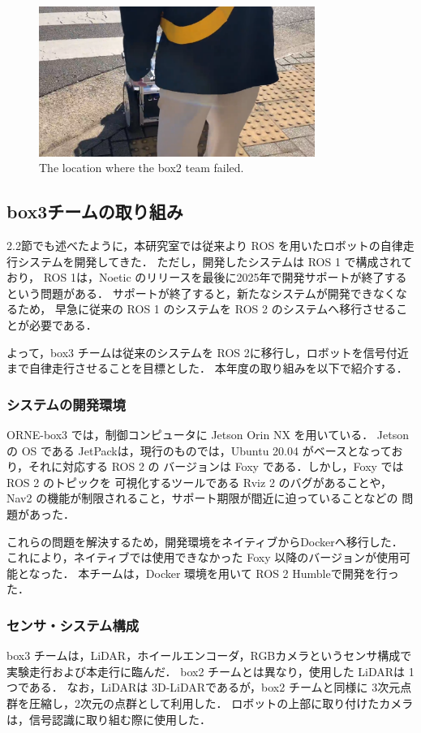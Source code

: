 \documentclass[twocolumn, 9pt]{jsproceedings}
\begin{document}
\begin{figure}[h!]
  \centering
  \includegraphics[width=90mm]{fig/result_box2_cut.pdf}
  \caption{The location where the box2 team failed.}
  \label{fig:box2-result}
\end{figure}

\subsection{box3チームの取り組み}
2.2節でも述べたように，本研究室では従来より ROS を用いたロボットの自律走行システムを開発してきた．
ただし，開発したシステムは ROS 1 で構成されており，
ROS 1は，Noetic\cite{noetic} のリリースを最後に2025年で開発サポートが終了するという問題がある．
サポートが終了すると，新たなシステムが開発できなくなるため，
早急に従来の ROS 1 のシステムを ROS 2 のシステムへ移行させることが必要である．

よって，box3 チームは従来のシステムを ROS 2に移行し，ロボットを信号付近まで自律走行させることを目標とした．
本年度の取り組みを以下で紹介する．

\subsubsection{システムの開発環境}
ORNE-box3 では，制御コンピュータに Jetson Orin NX を用いている．
Jetson の OS である JetPackは，現行のものでは，Ubuntu 20.04 がベースとなっており，それに対応する ROS 2 の
バージョンは Foxy\cite{foxy} である．しかし，Foxy では ROS 2 のトピックを 可視化するツールである Rviz 2 
のバグがあることや，Nav2\cite{nav2} の機能が制限されること，サポート期限が間近に迫っていることなどの
問題があった．

これらの問題を解決するため，開発環境をネイティブからDockerへ移行した．
これにより，ネイティブでは使用できなかった Foxy 以降のバージョンが使用可能となった．
本チームは，Docker 環境を用いて ROS 2 Humble\cite{humble}で開発を行った．


\subsubsection{センサ・システム構成}
box3 チームは，LiDAR，ホイールエンコーダ，RGBカメラというセンサ構成で実験走行および本走行に臨んだ．
box2 チームとは異なり，使用した LiDARは 1つである．
なお，LiDARは 3D-LiDARであるが，box2 チームと同様に 3次元点群を圧縮し，2次元の点群として利用した．
ロボットの上部に取り付けたカメラは，信号認識に取り組む際に使用した．
\end{document}
